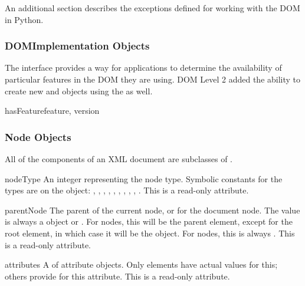 An additional section describes the exceptions defined for working
with the DOM in Python.


\subsubsection{DOMImplementation Objects
               \label{dom-implementation-objects}}

The  interface provides a way for
applications to determine the availability of particular features in
the DOM they are using.  DOM Level 2 added the ability to create new
 and  objects using the
 as well.

\begin{methoddesc}[DOMImplementation]{hasFeature}{feature, version}
\end{methoddesc}


\subsubsection{Node Objects \label{dom-node-objects}}

All of the components of an XML document are subclasses of
.

\begin{memberdesc}[Node]{nodeType}
An integer representing the node type.  Symbolic constants for the
types are on the  object:
, ,
, ,
, ,
, ,
, .
This is a read-only attribute.
\end{memberdesc}

\begin{memberdesc}[Node]{parentNode}
The parent of the current node, or  for the document node.
The value is always a  object or .  For
 nodes, this will be the parent element, except for the
root element, in which case it will be the  object.
For  nodes, this is always .
This is a read-only attribute.
\end{memberdesc}

\begin{memberdesc}[Node]{attributes}
A  of attribute objects.  Only elements have
actual values for this; others provide  for this attribute.
This is a read-only attribute.
\end{memberdesc}

